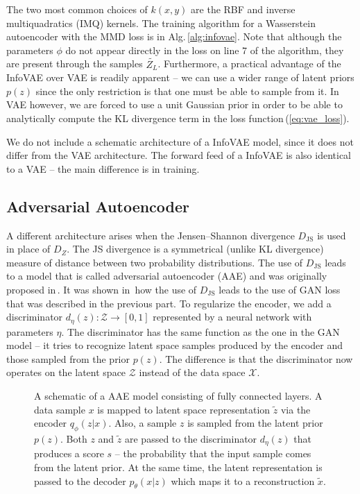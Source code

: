 The two most common choices of $k(x,y)$ are the RBF and inverse multiquadratics
(IMQ) kernels. The training algorithm for a Wasserstein autoencoder
with the MMD loss is in Alg.\,\ref{alg:infovae}. Note that although
the parameters $\phi$ do not appear directly in the loss on line
7 of the algorithm, they are present through the samples $\tilde{Z_{L}}$.
Furthermore, a practical advantage of the InfoVAE over VAE is readily
apparent -- we can use a wider range of latent priors $p(z)$ since
the only restriction is that one must be able to sample from it. In
VAE however, we are forced to use a unit Gaussian prior in order to
be able to analytically compute the KL divergence term in the loss
function\,(\ref{eq:vae_loss}). 

We do not include a schematic architecture of a InfoVAE model, since
it does not differ from the VAE architecture. The forward feed of
a InfoVAE is also identical to a VAE -- the main difference is in
training.

\subsection{Adversarial Autoencoder}

A different architecture arises when the Jensen--Shannon divergence
$D_{\text{JS}}$ is used in place of $D_{Z}$. The JS divergence is
a symmetrical (unlike KL divergence) measure of distance between two
probability distributions. The use of $D_{\text{JS}}$ leads to a
model that is called adversarial autoencoder (AAE) and was originally
proposed in\,\cite{makhzani2015adversarial}. It was shown in\,\cite{tolstikhin2017wasserstein}
how the use of $D_{\text{JS}}$ leads to the use of GAN loss that
was described in the previous part. To regularize the encoder, we
add a discriminator $d_{\eta}(z):\mathcal{Z}\rightarrow\left[0,1\right]$
represented by a neural network with parameters $\eta$. The discriminator
has the same function as the one in the GAN model -- it tries to
recognize latent space samples produced by the encoder and those sampled
from the prior $p(z)$. The difference is that the discriminator now
operates on the latent space $\mathcal{Z}$ instead of the data space
$\mathcal{X}$. 

\begin{figure}
\centering{}\caption{A schematic of a AAE model consisting of fully connected layers. A
data sample $x$ is mapped to latent space representation $\tilde{z}$
via the encoder $q_{\phi}(z|x)$. Also, a sample $z$ is sampled from
the latent prior $p(z)$. Both $z$ and $\tilde{z}$ are passed to
the discriminator $d_{\eta}(z)$ that produces a score $s$ -- the
probability that the input sample comes from the latent prior. At
the same time, the latent representation is passed to the decoder
$p_{\theta}(x|z)$ which maps it to a reconstruction $\tilde{x}$.}
\label{fig:aae}
\end{figure}

